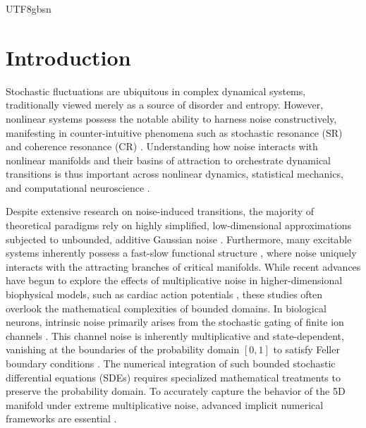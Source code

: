 ﻿\documentclass[reprint, amsmath, amssymb, aps, pre]{revtex4-2}
\begin{document}
\begin{CJK*}{UTF8}{gbsn}
\section{Introduction}
\label{sec:intro}

Stochastic fluctuations are ubiquitous in complex dynamical systems, traditionally viewed merely as a source of disorder and entropy. However, nonlinear systems possess the notable ability to harness noise constructively, manifesting in counter-intuitive phenomena such as stochastic resonance (SR) and coherence resonance (CR) \cite{pikovsky1997coherence, gammaitoni1998stochastic, lindner2004effects}. Understanding how noise interacts with nonlinear manifolds and their basins of attraction to orchestrate dynamical transitions is thus important across nonlinear dynamics, statistical mechanics, and computational neuroscience \cite{yoon2024tracking, freidlin2012random}.

Despite extensive research on noise-induced transitions, the majority of theoretical paradigms rely on highly simplified, low-dimensional approximations subjected to unbounded, additive Gaussian noise \cite{yamakou2020optimal}. Furthermore, many excitable systems inherently possess a fast-slow functional structure \cite{wechselberger2020geometric, berglund2006noise}, where noise uniquely interacts with the attracting branches of critical manifolds. While recent advances have begun to explore the effects of multiplicative noise in higher-dimensional biophysical models, such as cardiac action potentials \cite{bashkirtseva2025analysis}, these studies often overlook the mathematical complexities of bounded domains. In biological neurons, intrinsic noise primarily arises from the stochastic gating of finite ion channels \cite{faisal2008noise}. This channel noise is inherently multiplicative and state-dependent, vanishing at the boundaries of the probability domain $[0,1]$ to satisfy Feller boundary conditions \cite{goldwyn2011what, yu2022effects}. The numerical integration of such bounded stochastic differential equations (SDEs) requires specialized mathematical treatments to preserve the probability domain. To accurately capture the behavior of the 5D manifold under extreme multiplicative noise, advanced implicit numerical frameworks are essential \cite{higham2005convergence, lord2010comparison, hutzenthaler2020perturbation}.


\end{CJK*}
\end{document}
